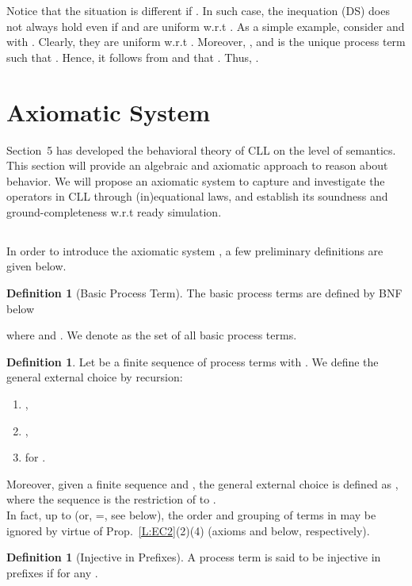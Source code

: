 \documentclass{elsarticle}
\theoremstyle{plain}
\theoremstyle{definition}
\newtheorem{mydefn}[theorem]{Definition}
\begin{document}
Notice that the situation is different if .
In such case, the inequation (DS) does not always hold even if  and  are  uniform w.r.t .
As a simple example, consider  and  with .
Clearly, they are uniform w.r.t .
Moreover, ,  and  is the unique process term such that .
Hence, it follows from  and  that .
Thus, .

\section{Axiomatic System }
Section~5 has developed the behavioral theory of CLL on the level of semantics. This section will provide an algebraic and axiomatic approach to reason about behavior.
We will propose an axiomatic system to capture and investigate the operators in CLL through (in)equational laws, and establish its soundness and ground-completeness w.r.t ready simulation.

\subsection{}
In order to introduce the axiomatic system , a few preliminary definitions are given below.


\begin{mydefn}[Basic Process Term] \label{D:BPT}
The basic process terms are defined by BNF below

where  and . We denote  as the set of all basic process terms.
\end{mydefn}

\begin{mydefn}\label{D:GEC}
Let  be a finite sequence of process terms with . We define the general external choice  by recursion:
\begin{enumerate}
  \item ,
  \item ,
  \item  for .
\end{enumerate}
\end{mydefn}

Moreover, given a finite sequence  and , the general external choice  is defined as , where the sequence  is the restriction of  to .\\

In fact, up to  (or, =, see below), the order and grouping of terms in  may be ignored by virtue of Prop.~\ref{L:EC2}(2)(4) (axioms  and  below, respectively).

\begin{mydefn}[Injective in Prefixes]
  A process term  is said to be injective in prefixes if  for any .
\end{mydefn}
\end{document}
